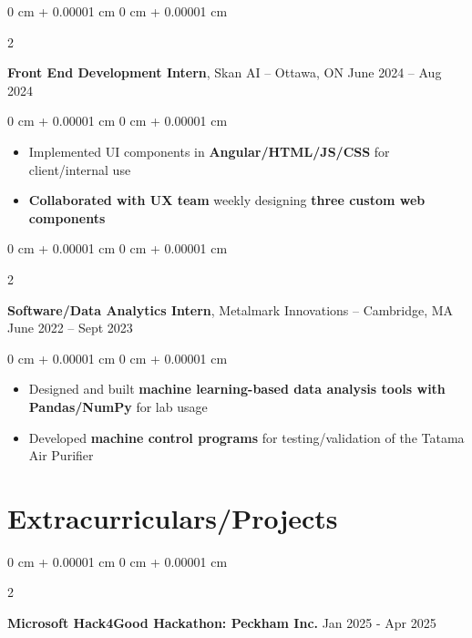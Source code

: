 \documentclass[10pt, letterpaper]{article}
\newenvironment{highlights}{
    \begin{itemize}[
        topsep=0.10 cm,
        parsep=0.10 cm,
        partopsep=0pt,
        itemsep=0pt,
        leftmargin=0 cm + 10pt
    ]
}{
    \end{itemize}
} %
\newenvironment{onecolentry}{
    \begin{adjustwidth}{
        0 cm + 0.00001 cm
    }{
        0 cm + 0.00001 cm
    }
}{
    \end{adjustwidth}
} %
\newenvironment{twocolentry}[2][]{
    \onecolentry
    \def\secondColumn{#2}
    \setcolumnwidth{\fill, 4.5 cm}
    \begin{paracol}{2}
}{
    \switchcolumn \raggedleft \secondColumn
    \end{paracol}
    \endonecolentry
} %
\begin{document}
        
        \begin{twocolentry}{
            June 2024 – Aug 2024
        }
            \textbf{Front End Development Intern}, Skan AI -- Ottawa, ON\end{twocolentry}

        \vspace{0.10 cm}
        \begin{onecolentry}
            \begin{highlights}
                \item Implemented UI components in \textbf{Angular/HTML/JS/CSS} for client/internal use
                \item \textbf{Collaborated with UX team} weekly designing \textbf{three custom web components}
            \end{highlights}
        \end{onecolentry}


        \vspace{0.2 cm}

        \begin{twocolentry}{
            June 2022 – Sept 2023
        }
            \textbf{Software/Data Analytics Intern}, Metalmark Innovations -- Cambridge, MA\end{twocolentry}

        \vspace{0.10 cm}
        \begin{onecolentry}
            \begin{highlights}
                \item Designed and built \textbf{machine learning-based data analysis tools with Pandas/NumPy} for lab usage
                \item Developed \textbf{machine control programs} for testing/validation of the Tatama Air Purifier
            \end{highlights}
        \end{onecolentry}
        
    \section{Extracurriculars/Projects}

        \begin{twocolentry}{
            Jan 2025 - Apr 2025
        }
            \textbf{Microsoft Hack4Good Hackathon: Peckham Inc.}\end{twocolentry}
\end{document}
